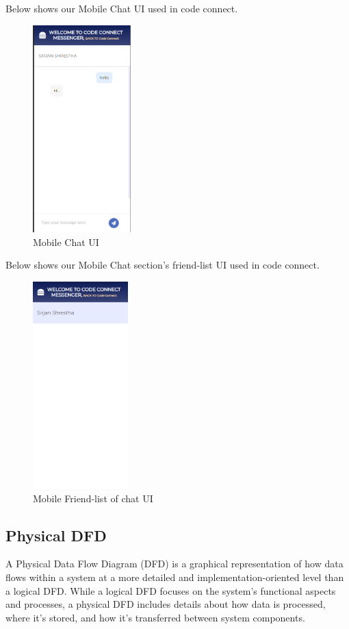 \newpage
Below shows our Mobile Chat UI used in code connect.
\begin{figure}[H]
  \centering
  \includegraphics[height = 8cm]{Outcome-ss/mobile-chat.png}
  \caption{Mobile Chat UI}
\end{figure}

Below shows our Mobile Chat section's friend-list UI used in code connect.
\begin{figure}[H]
  \centering
  \includegraphics[height = 8cm]{Outcome-ss/moble-chat-friends.png}
  \caption{Mobile Friend-list of chat UI}
\end{figure}
\newpage
\subsection{Physical DFD}
A Physical Data Flow Diagram (DFD) is a graphical representation of how data flows within a system at a more detailed and implementation-oriented level than a logical DFD. While a logical DFD focuses on the system's functional aspects and processes, a physical DFD includes details about how data is processed, where it's stored, and how it's transferred between system components.

